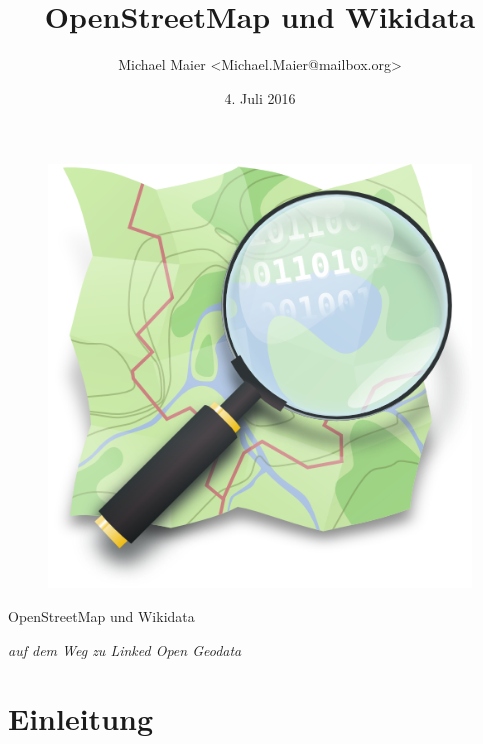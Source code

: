 \documentclass{beamer}
\title{OpenStreetMap und Wikidata}
\author{Michael Maier \textless Michael.Maier@mailbox.org\textgreater}
\date{4. Juli 2016}
\begin{document}

\begin{frame} 


\begin{figure}
  \centering
  \includegraphics[width=.5\textwidth]{mag_map.png}
\end{figure}

\begin{center}
\Huge{OpenStreetMap und Wikidata\\}
\end{center}

\begin{center}
\Large{\emph{auf dem Weg zu Linked Open Geodata}}
\end{center}

\end{frame}


\section{Einleitung}
\end{document}
